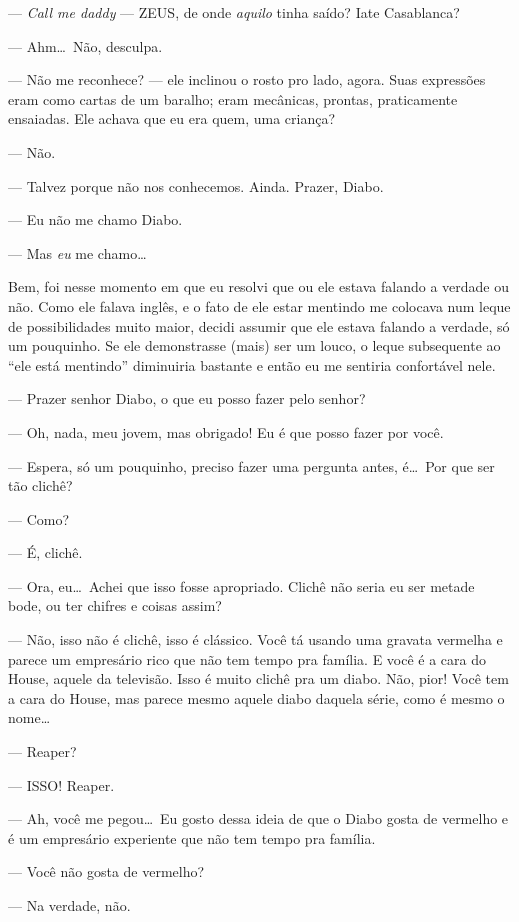 --- \emph{Call me daddy} --- ZEUS, de onde \emph{aquilo} tinha saído? Iate Casablanca?

--- Ahm\ldots \ Não, desculpa.

--- Não me reconhece? --- ele inclinou o rosto pro lado, agora. Suas expressões eram como cartas de um baralho; eram mecânicas, prontas, praticamente ensaiadas. Ele achava que eu era quem, uma criança?

--- Não.

--- Talvez porque não nos conhecemos. Ainda. Prazer, Diabo.

--- Eu não me chamo Diabo.

--- Mas \emph{eu} me chamo\ldots

Bem, foi nesse momento em que eu resolvi que ou ele estava falando a verdade ou não. Como ele falava inglês, e o fato de ele estar mentindo me colocava num leque de possibilidades muito maior, decidi assumir que ele estava falando a verdade, só um pouquinho. Se ele demonstrasse (mais) ser um louco, o leque subsequente ao ``ele está mentindo'' diminuiria bastante e então eu me sentiria confortável nele.

--- Prazer senhor Diabo, o que eu posso fazer pelo senhor?

--- Oh, nada, meu jovem, mas obrigado! Eu é que posso fazer por você.

--- Espera, só um pouquinho, preciso fazer uma pergunta antes, é\ldots \ Por que ser tão clichê?

--- Como?

--- É, clichê.

--- Ora, eu\ldots \ Achei que isso fosse apropriado. Clichê não seria eu ser metade bode, ou ter chifres e coisas assim?

--- Não, isso não é clichê, isso é clássico. Você tá usando uma gravata vermelha e parece um empresário rico que não tem tempo pra família. E você é a cara do House, aquele da televisão. Isso é muito clichê pra um diabo. Não, pior! Você tem a cara do House, mas parece mesmo aquele diabo daquela série, como é mesmo o nome\ldots

--- Reaper?

--- ISSO! Reaper.

--- Ah, você me pegou\ldots \ Eu gosto dessa ideia de que o Diabo gosta de vermelho e é um empresário experiente que não tem tempo pra família.

--- Você não gosta de vermelho?

--- Na verdade, não.


